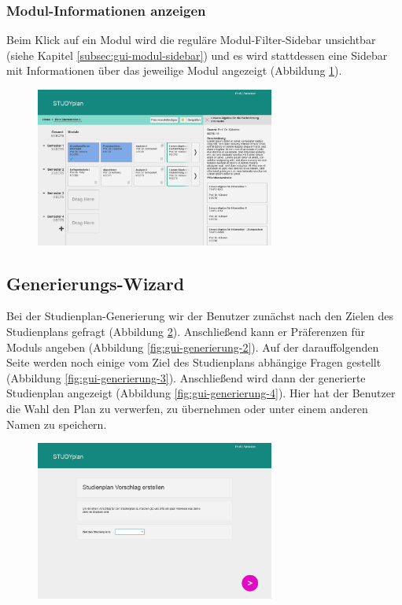 \subsubsection{Modul-Informationen anzeigen}
Beim Klick auf ein Modul wird die reguläre Modul-Filter-Sidebar unsichtbar (siehe Kapitel \ref{subsec:gui-modul-sidebar}) und es wird stattdessen eine Sidebar mit Informationen über das jeweilige Modul angezeigt (Abbildung \ref{fig:gui-modul-info-1}).
\begin{figure}[!htb]
	\caption{}
	\label{fig:gui-modul-info-1}
	\centering
	\includegraphics[width=0.7\textwidth]{../GUI/ergebnisse/modul-info-1.png}
\end{figure}


\subsection{Generierungs-Wizard}
\label{subsec:gui-generierung}
Bei der Studienplan-Generierung wir der \gls{Benutzer} zunächst nach den Zielen des Studienplans gefragt (Abbildung \ref{fig:gui-generierung-1}). Anschließend kann er Präferenzen für \glspl{Modul} angeben (Abbildung \ref{fig:gui-generierung-2}). Auf der darauffolgenden Seite werden noch einige vom Ziel des Studienplans abhängige Fragen gestellt (Abbildung \ref{fig:gui-generierung-3}). Anschließend wird dann der generierte Studienplan angezeigt (Abbildung \ref{fig:gui-generierung-4}). Hier hat der \gls{Benutzer} die Wahl den Plan zu verwerfen, zu übernehmen oder unter einem anderen Namen zu speichern.
\begin{figure}[!htb]
	\caption{}
	\label{fig:gui-generierung-1}
	\centering
	\includegraphics[width=0.7\textwidth]{../GUI/ergebnisse/generierung-1.png}
\end{figure}


